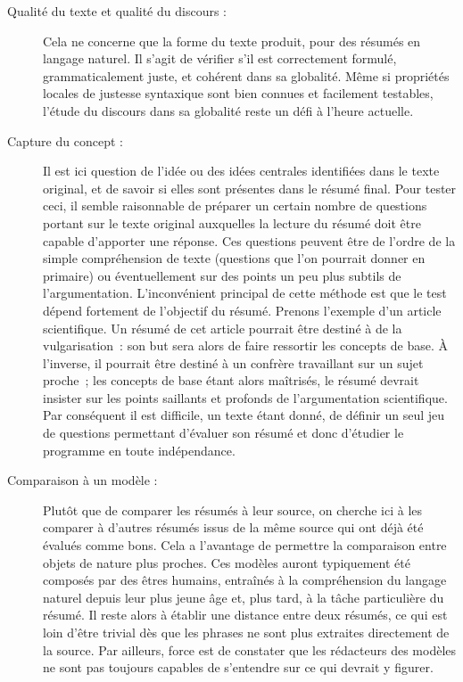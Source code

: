 \documentclass[a4paper, 12pt]{article}
\begin{document}
\begin{description}
  \item [Qualité du texte et qualité du discours :] Cela ne concerne que la forme du texte produit, pour des résumés en langage naturel. Il s'agit de vérifier s'il est correctement formulé, grammaticalement juste, et cohérent dans sa globalité. Même si propriétés locales de justesse syntaxique sont bien connues et facilement testables, l'étude du discours dans sa globalité reste un défi à l'heure actuelle.
  \item [Capture du concept :] Il est ici question de l'idée ou des idées centrales identifiées dans le texte original, et de savoir si elles sont présentes dans le résumé final. Pour tester ceci, il semble raisonnable de préparer un certain nombre de questions portant sur le texte original auxquelles la lecture du résumé doit être capable d'apporter une réponse. Ces questions peuvent être de l'ordre de la simple compréhension de texte (questions que l'on pourrait donner en primaire) ou éventuellement sur des points un peu plus subtils de l'argumentation. L'inconvénient principal de cette méthode est que le test dépend fortement de l'objectif du résumé. Prenons l'exemple d'un article scientifique. Un résumé de cet article pourrait être destiné à de la vulgarisation~: son but sera alors de faire ressortir les concepts de base. À l'inverse, il pourrait être destiné à un confrère travaillant sur un sujet proche~; les concepts de base étant alors maîtrisés, le résumé devrait insister sur les points saillants et profonds de l'argumentation scientifique. Par conséquent il est difficile, un texte étant donné, de définir un seul jeu de questions permettant d'évaluer son résumé et donc d'étudier le programme en toute indépendance.
  \item [Comparaison à un modèle :] Plutôt que de comparer les résumés à leur source, on cherche ici à les comparer à d'autres résumés issus de la même source qui ont déjà été évalués comme bons. Cela a l'avantage de permettre la comparaison entre objets de nature plus proches. Ces modèles auront typiquement été composés par des êtres humains, entraînés à la compréhension du langage naturel depuis leur plus jeune âge et, plus tard, à la tâche particulière du résumé. Il reste alors à établir une distance entre deux résumés, ce qui est loin d'être trivial dès que les phrases ne sont plus extraites directement de la source. Par ailleurs, force est de constater que les rédacteurs des modèles ne sont pas toujours capables de s'entendre sur ce qui devrait y figurer.
 \end{description}
\end{document}
